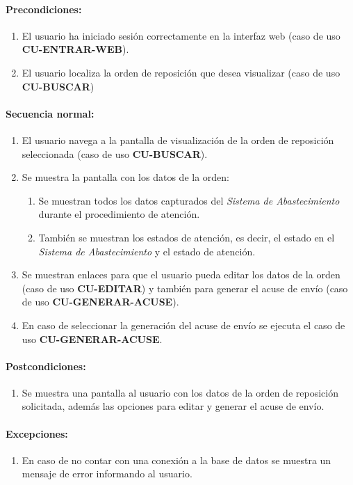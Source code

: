 \paragraph{Precondiciones:}
\begin{enumerate}
  \item El usuario ha iniciado sesión correctamente en la interfaz web (caso de uso \textbf{CU-ENTRAR-WEB}).
  \item El usuario localiza la orden de reposición que desea visualizar (caso de uso \textbf{CU-BUSCAR})
\end{enumerate}
\paragraph{Secuencia normal:}
\begin{enumerate}
  \item El usuario navega a la pantalla de visualización de la orden de reposición seleccionada (caso de uso \textbf{CU-BUSCAR}).
  \item Se muestra la pantalla con los datos de la orden:
  \begin{enumerate}
    \item Se muestran todos los datos capturados del \textit{Sistema de Abastecimiento} durante el procedimiento de atención.
    \item También se muestran los estados de atención, es decir, el estado en el \textit{Sistema de Abastecimiento}  y el estado de atención.
  \end{enumerate}
  \item Se muestran enlaces para que el usuario pueda editar los datos de la orden (caso de uso \textbf{CU-EDITAR}) y también para generar el acuse de envío (caso de uso \textbf{CU-GENERAR-ACUSE}).
  \item En caso de seleccionar la generación del acuse de envío se ejecuta el caso de uso \textbf{CU-GENERAR-ACUSE}.
\end{enumerate}
\paragraph{Postcondiciones:}
\begin{enumerate}
  \item Se muestra una pantalla al usuario con los datos de la orden de reposición solicitada, además las opciones para editar y generar el acuse de envío.
\end{enumerate}
\paragraph{Excepciones:}
\begin{enumerate}
  \item En caso de no contar con una conexión a la base de datos se muestra un mensaje de error informando al usuario.
\end{enumerate}


